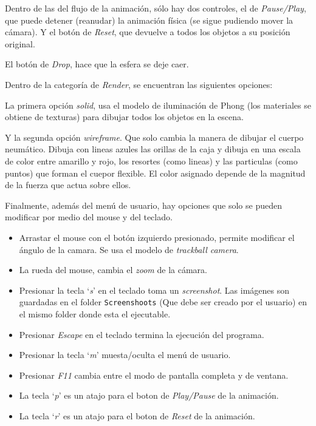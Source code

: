 Dentro de las del flujo de la animación, sólo hay dos controles, el de \emph{\textenglish{Pause/Play}}, que puede detener (reanudar) la animación física (se sigue pudiendo mover la cámara).
Y el botón de \emph{\textenglish{Reset}}, que devuelve a todos los objetos a su posición original.

El botón de \emph{\textenglish{Drop}}, hace que la esfera se deje caer.

Dentro de la categoría de \emph{\textenglish{Render}}, se encuentran las siguientes opciones:

La primera opción \emph{\textenglish{solid}}, usa el modelo de iluminación de Phong (los materiales se obtiene de texturas) para dibujar todos los objetos en la escena.

Y la segunda opción \emph{\textenglish{wireframe}}. 
Que solo cambia la manera de dibujar el cuerpo neumático.
Dibuja con lineas azules las orillas de la caja y dibuja en una escala de color entre amarillo y rojo, los resortes (como lineas) y las particulas (como puntos) que forman el cuepor flexible.
El color asignado depende de la magnitud de la fuerza que actua sobre ellos.

Finalmente, además del menú de usuario, hay opciones que solo se pueden modificar por medio del \textenglish{mouse} y del teclado.

\begin{itemize}
 \item Arrastar el mouse con el botón izquierdo presionado, permite modificar el ángulo de la camara. Se usa el modelo de \emph{\textenglish{trackball camera}}.
 \item La rueda del mouse, cambia el \emph{\textenglish{zoom}} de la cámara.
 \item Presionar la tecla `\emph{s}' en el teclado toma un \emph{\textenglish{screenshot}}. Las imágenes son guardadas en el folder \texttt{Screenshoots} (Que debe ser creado por el usuario) en el mismo folder donde esta el ejecutable.
 \item Presionar \emph{Escape} en el teclado termina la ejecución del programa.
 \item Presionar la tecla `\emph{m}' muesta/oculta el menú de usuario.
 \item Presionar \emph{F11} cambia entre el modo de pantalla completa y de ventana.
 \item La tecla `\emph{p}' es un atajo para el boton de \emph{\textenglish{Play/Pause}} de la animación.
 \item La tecla `\emph{r}' es un atajo para el boton de \emph{\textenglish{Reset}} de la animación.
\end{itemize}

